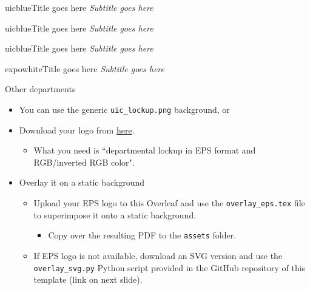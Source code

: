 \documentclass{beamer}
\newcommand{\hrefcol}[2]{\textcolor{uihteal}{\href{#1}{#2}}}
\begin{document}
\begin{chapter}{uicblue}{Title goes here}
\textit{Subtitle goes here}
\end{chapter}

\begin{chapter}{uicblue}{Title goes here}
\textit{Subtitle goes here}
\end{chapter}

\begin{chapter}{uicblue}{Title goes here}
\textit{Subtitle goes here}
\end{chapter}

\begin{chapter}{expowhite}{Title goes here}
\textit{Subtitle goes here}
\end{chapter}

\begin{frame}[fragile]{Other departments}
\begin{itemize}
\item You can use the generic \texttt{uic\_lockup.png} background, or
\item Download your logo from \hrefcol{https://marketing.uic.edu/marketing-toolbox/university-style-guide/university-marks-logos/}{here}.
    \begin{itemize}
    \item What you need is ``departmental lockup in EPS format and RGB/inverted RGB color".
    \end{itemize}
\item Overlay it on a static background
    \begin{itemize}
    \item Upload your EPS logo to this Overleaf and use the \texttt{overlay\_eps.tex} file to superimpose it onto a static background.
    \begin{itemize}
    \item Copy over the resulting PDF to the \texttt{assets} folder.
    \end{itemize}
    \item If EPS logo is not available, download an SVG version and use the \texttt{overlay\_svg.py} Python script provided in the GitHub repository of this template (link on next slide).
    \end{itemize}
\end{itemize}
\end{frame}
\end{document}
